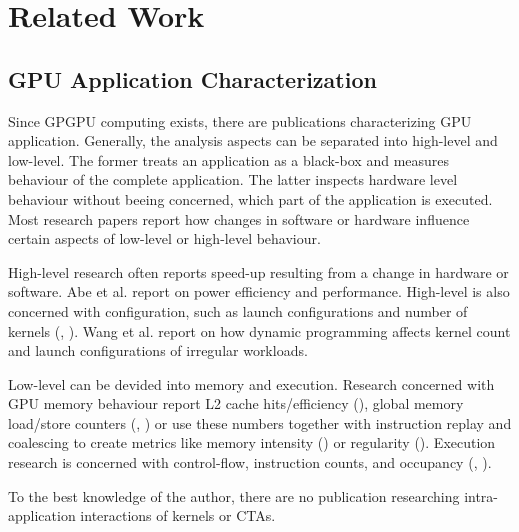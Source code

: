 \chapter{Related Work}
\section{GPU Application Characterization}
Since GPGPU computing exists, there are publications characterizing GPU application. Generally, the analysis
aspects can be separated into high-level and low-level. The former treats an application as a black-box
and measures behaviour of the complete application. The latter inspects hardware level behaviour without
beeing concerned, which part of the application is executed. Most research papers report how changes in software or hardware influence certain aspects of low-level or high-level behaviour.

High-level research often reports speed-up resulting from a change in hardware or software. Abe et al. \cite{6877247} report on power efficiency and performance. 
High-level is also concerned with configuration, such as launch configurations and number of kernels (\cite{6983039}, \cite{Kerr:2009:CAP:1678998.1680778}). Wang et al. \cite{6983039} report on how dynamic programming affects kernel count and launch configurations of irregular workloads. 

Low-level can be devided into memory and execution.
Research concerned with GPU memory behaviour report L2 cache hits/efficiency (\cite{microarch}), global memory load/store counters (\cite{microarch}, \cite{6983039}) or use these numbers together with instruction replay and coalescing to create metrics like memory intensity (\cite{Kerr:2009:CAP:1678998.1680778}) or regularity (\cite{Burtscher:2012:QSI:2473499.2474126}).  Execution research is concerned with control-flow, instruction counts, and occupancy (\cite{microarch}, \cite{Kerr:2009:CAP:1678998.1680778}).

To the best  knowledge of the author, there are no publication researching intra-application interactions of kernels or CTAs.
